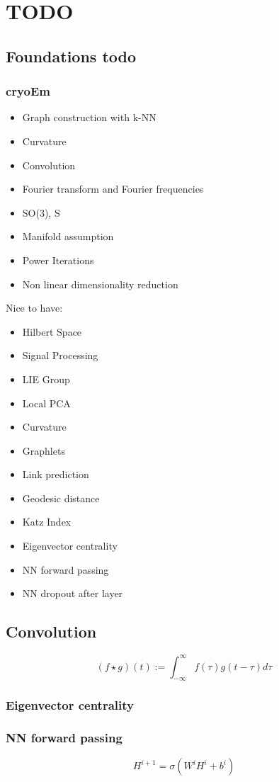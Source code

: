 
\chapter{TODO}
\section{Foundations todo}

\subsection{cryoEm}


\begin{itemize}
    \item Graph construction with k-NN
    \item Curvature
    \item Convolution
    \item Fourier transform and Fourier frequencies
    \item SO(3), S
    \item Manifold assumption
    \item Power Iterations
    \item Non linear dimensionality reduction
\end{itemize}

Nice to have:
\begin{itemize}
    \item Hilbert Space
    \item Signal Processing    
    \item LIE Group
    \item Local PCA
    \item Curvature
    \item Graphlets
    \item Link prediction
    \item Geodesic distance
    \item Katz Index
    \item Eigenvector centrality
    \item NN forward passing
    \item NN dropout after layer
\end{itemize}

\section{Convolution}
\begin{equation}
    (f \star g)(t) := \int_{-\infty}^{\infty} f(\tau) g(t - \tau) d\tau
\end{equation}

\subsection{Eigenvector centrality}
\subsection{NN forward passing}
\begin{equation}
    H^{i + 1} = \sigma ( W^i H ^i + b^i) 
\end{equation}
